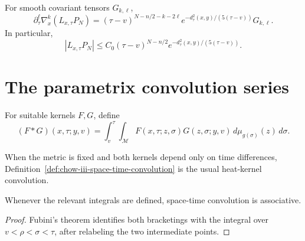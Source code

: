 \begin{lemma}
\label{lem:chow-iii-cutoff-parametrix-error-derivatives}


For smooth covariant tensors \(G_{k,\ell}\),
\[
 \partial_\tau^\ell\nabla_x^k(L_{x,\tau}P_N)
 =(\tau-v)^{N-n/2-k-2\ell}
 e^{-d_\tau^2(x,y)/(5(\tau-v))}G_{k,\ell}.
\]
In particular,
\[
 |L_{x,\tau}P_N|\le C_0(\tau-v)^{N-n/2}
 e^{-d_\tau^2(x,y)/(5(\tau-v))}.
\]
\end{lemma}

\section{The parametrix convolution series}

\begin{definition}
\label{def:chow-iii-space-time-convolution}

For suitable kernels \(F,G\), define
\[
 (F*G)(x,\tau;y,v)=\int_v^\tau\!\int_{\mathcal M}
 F(x,\tau;z,\sigma)G(z,\sigma;y,v)
 \,d\mu_{g(\sigma)}(z)\,d\sigma.
\]
\end{definition}

\begin{remark}
\label{rem:chow-iii-static-convolution}

When the metric is fixed and both kernels depend only on time differences,
Definition~\ref{def:chow-iii-space-time-convolution} is the usual heat-kernel
convolution.
\end{remark}

\begin{lemma}
\label{lem:chow-iii-space-time-convolution-associative}


Whenever the relevant integrals are defined, space-time convolution is
associative.
\end{lemma}
\begin{proof}
\sketch Fubini's theorem identifies both bracketings with the integral over
\(v<\rho<\sigma<\tau\), after relabeling the two intermediate points.
\end{proof}

